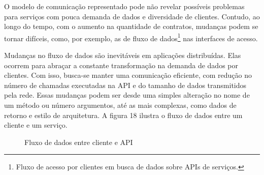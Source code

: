 O modelo de comunicação representado pode não revelar possíveis problemas para serviços com pouca demanda de dados e diversidade de clientes. Contudo, ao longo do tempo, com o aumento na quantidade de contratos, mudanças podem se tornar difíceis, como, por exemplo, as de fluxo de dados\footnote{
  Fluxo de acesso por clientes em busca de dados sobre APIs de serviços.
} nas interfaces de acesso.

Mudanças no fluxo de dados são inevitáveis em aplicações distribuídas. Elas ocorrem para abraçar a constante transformação na demanda de dados por clientes. Com isso, busca-se manter uma comunicação eficiente, com redução no número de chamadas executadas na API e do tamanho de dados transmitidos pela rede. Essas mudanças podem ser desde uma simples alteração no nome de um método ou número argumentos, até as mais complexas, como dados de retorno e estilo de arquitetura. A figura 18 ilustra o fluxo de dados entre um cliente e um serviço.

\begin{figure}[H]
  \centering
  \caption{Fluxo de dados entre cliente e API}
\end{figure}

